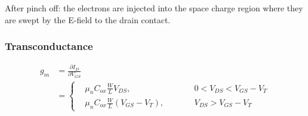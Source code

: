 \documentclass{beamer}
\begin{document}
\begin{frame}
\begin{figure}[H]
\begin{subfigure}[b]{0.45\linewidth}
                \label{subfig:Vgs-increasing-2.jpg}
            \end{subfigure}
        \end{figure}
        \par After pinch off: the electrons are injected into the space charge region where they are swept by the E-field to the drain contact.
    \end{frame}

    \begin{frame} \frametitle{Transconductance}
        \begin{equation*}
            \begin{aligned}
                g_{m} &= \frac{\partial I_D}{\partial V_{GS} } \\ 
                &= \left\{
                    \begin{aligned}
                        & \mu_n C_{ox} \frac{W}{L} V_{DS} ,\qquad&& 0 < V_{DS} < V_{GS} - V_T \\
                        & \mu_n C_{ox} \frac{W}{L} \left( V_{GS}  - V_T \right) ,\qquad&& V_{DS} > V_{GS} - V_T
                    \end{aligned}
                \right.
            \end{aligned}
        \end{equation*}
    \end{frame}
\end{document}
